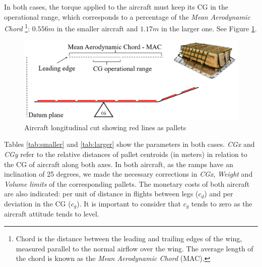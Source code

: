 \documentclass[preprint,authoryear]{elsarticle}
\begin{document}
In both cases, the torque applied to the aircraft must keep its CG in the operational range, which corresponds to a percentage of the {\it Mean Aerodynamic Chord} \footnote{Chord is the distance between the leading and trailing edges of the wing, measured parallel to the normal airflow over the wing. The average length of the chord is known as the {\it Mean Aerodynamic Chord} (MAC).}: $0.556m$ in the smaller aircraft and $1.17m$ in the larger one. See Figure \ref{fig:lateral}.

\begin{figure}[H]
	\centering
	\includegraphics[scale=0.22]{Images/lateral.png}
	\caption{Aircraft longitudinal cut showing red lines as pallets}
	\label{fig:lateral}
\end{figure}



Tables \ref{tab:smaller} and \ref{tab:larger} show the parameters in both cases. {\it CGx} and {\it CGy} refer to the relative distances of pallet centroids (in meters) in relation to the CG of aircraft along both axes. In both aircraft, as the ramps have an inclination of 25 degrees, we made the necessary corrections in {\it CGx}, {\it Weight} and {\it Volume limits} of the corresponding pallets. The monetary costs of both aircraft are also indicated: per unit of distance in flights between legs ($c_d$) and per deviation in the CG ($c_g$). It is important to consider that $c_g$ tends to zero as the aircraft attitude tends to level.
\end{document}
